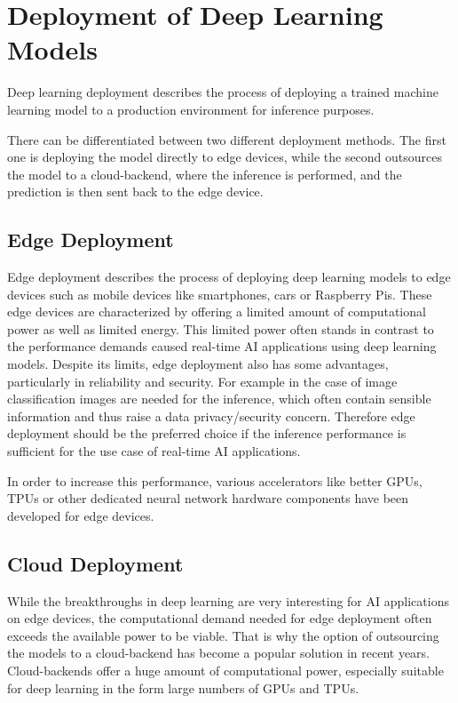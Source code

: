 \section{Deployment of Deep Learning Models}
Deep learning deployment describes the process of deploying a trained machine learning model to a production environment for inference purposes. 

There can be differentiated between two different deployment methods. The first one is deploying the model directly to edge devices, while the second outsources the model to a cloud-backend, where the inference is performed, and the prediction is then sent back to the edge device.
\subsection{Edge Deployment}
Edge deployment describes the process of deploying deep learning models to edge devices such as mobile devices like smartphones, cars or Raspberry Pis.
These edge devices are characterized by offering a limited amount of computational power as well as limited energy.
This limited power often stands in contrast to the performance demands caused real-time AI applications using deep learning models.
Despite its limits, edge deployment also has some advantages, particularly in reliability and security. 
For example in the case of image classification images are needed for the inference, which often contain sensible information and thus raise a data privacy/security concern.
Therefore edge deployment should be the preferred choice if the inference performance is sufficient for the use case of real-time AI applications.

In order to increase this performance, various accelerators like better GPUs, TPUs or other dedicated neural network hardware components have been developed for edge devices.



\subsection{Cloud Deployment}
While the breakthroughs in deep learning are very interesting for AI applications on edge devices, the computational demand needed for edge deployment often exceeds the available power to be viable.
That is why the option of outsourcing the models to a cloud-backend has become a popular solution in recent years.
Cloud-backends offer a huge amount of computational power, especially suitable for deep learning in the form large numbers of GPUs and TPUs.


